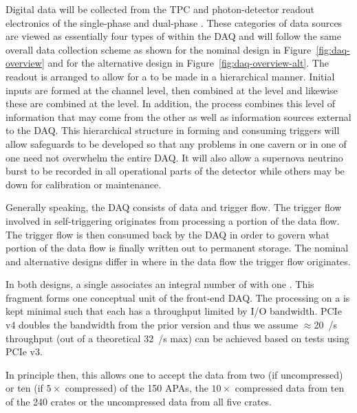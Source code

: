 Digital data will be collected from the TPC and photon-detector
readout electronics of the single-phase and dual-phase
. 
These categories of data sources are viewed as essentially four types
of  within the DAQ and will follow the same overall
data collection scheme as shown for the nominal design in
Figure~\ref{fig:daq-overview} and for the alternative design in
Figure~\ref{fig:daq-overview-alt}. 
The readout is arranged to allow for a  to be made
in a hierarchical manner. 
Initial inputs are formed at the channel level, then combined at the
 level and likewise these are combined at the
 level.
In addition, the  process combines this level of
information that may come from the other  as well as
information sources external to the DAQ. 
This hierarchical structure in forming and consuming triggers will
allow safeguards to be developed so that any problems in one cavern or
in one  of one  need not overwhelm the
entire DAQ.
It will also allow a supernova neutrino burst to be recorded in all
operational parts of the detector while others may be down for
calibration or maintenance.

Generally speaking, the DAQ consists of data and trigger flow.
The trigger flow involved in self-triggering originates from
processing a portion of the data flow. 
The trigger flow is then consumed back by the DAQ in order to govern
what portion of the data flow is finally written out to permanent
storage. 
The nominal and alternative designs differ in where in the data flow
the trigger flow originates. 

In both designs, a single  associates an integral
number of  with one .
This fragment forms one conceptual unit of the front-end DAQ.
The processing on a  is kept minimal such that each has a
throughput limited by I/O bandwidth. 
PCIe v4 doubles the bandwidth from the prior version and thus we
assume $\approx$\SI{20}{\GB/\s} throughput (out of a theoretical
\SI{32}{\GB/\s} max) can be achieved based on tests using PCIe v3.

In principle then, this allows one  to accept the data from
two (if uncompressed) or ten (if $5\times$ compressed) of the 150
 APAs, the $10\times$ compressed data from ten of the 240
  crates or the uncompressed data from all five
  crates.

